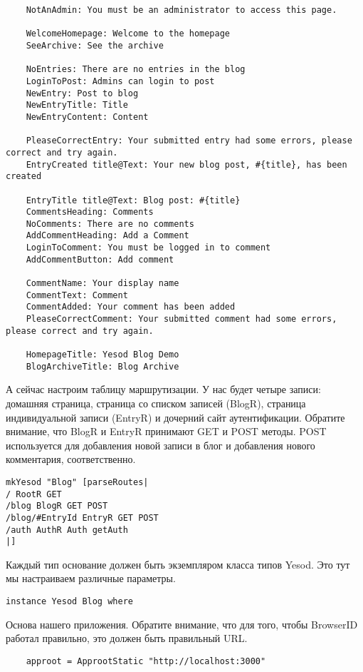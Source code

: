 \begin{lstlisting}
    NotAnAdmin: You must be an administrator to access this page.

    WelcomeHomepage: Welcome to the homepage
    SeeArchive: See the archive

    NoEntries: There are no entries in the blog
    LoginToPost: Admins can login to post
    NewEntry: Post to blog
    NewEntryTitle: Title
    NewEntryContent: Content

    PleaseCorrectEntry: Your submitted entry had some errors, please correct and try again.
    EntryCreated title@Text: Your new blog post, #{title}, has been created

    EntryTitle title@Text: Blog post: #{title}
    CommentsHeading: Comments
    NoComments: There are no comments
    AddCommentHeading: Add a Comment
    LoginToComment: You must be logged in to comment
    AddCommentButton: Add comment

    CommentName: Your display name
    CommentText: Comment
    CommentAdded: Your comment has been added
    PleaseCorrectComment: Your submitted comment had some errors, please correct and try again.

    HomepageTitle: Yesod Blog Demo
    BlogArchiveTitle: Blog Archive
\end{lstlisting}

А сейчас настроим таблицу маршрутизации. У нас будет четыре записи: домашняя страница, страница со списком записей (BlogR), страница индивидуальной записи (EntryR) и дочерний сайт аутентификации. Обратите внимание, что BlogR и EntryR принимают GET и POST методы. POST используется для добавления новой записи в блог и добавления нового комментария, соответственно.
 
\begin{lstlisting}
mkYesod "Blog" [parseRoutes|
/ RootR GET
/blog BlogR GET POST
/blog/#EntryId EntryR GET POST
/auth AuthR Auth getAuth
|]
\end{lstlisting}
 
Каждый тип основание должен быть экземпляром класса типов Yesod. Это тут мы настраиваем различные параметры.
 
\begin{lstlisting}
instance Yesod Blog where
\end{lstlisting}
 
Основа нашего приложения. Обратите внимание, что для того, чтобы BrowserID работал правильно, это должен быть правильный URL.
 
\begin{lstlisting}
    approot = ApprootStatic "http://localhost:3000"
\end{lstlisting}
 

